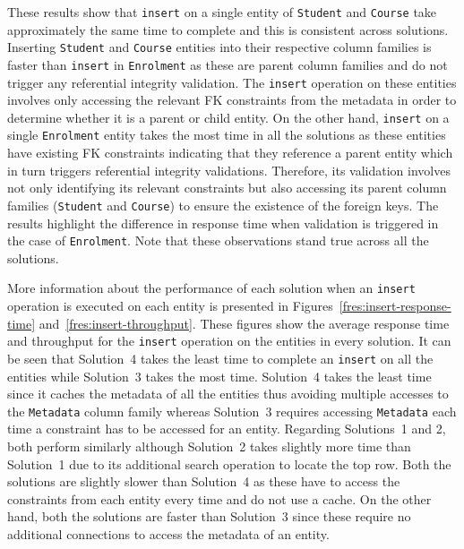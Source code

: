 These results show
that \texttt{insert} on a single entity of \texttt{Student} and \texttt{Course}
take approximately the same time to complete and this is consistent across
solutions.  Inserting \texttt{Student} and \texttt{Course} entities into their
respective column families is faster than \texttt{insert} in \texttt{Enrolment}
as these are parent column families and do not trigger any
referential integrity validation.
The \texttt{insert} operation on these entities involves only accessing the
relevant \ac{FK} constraints from the metadata in order to determine whether it
is a parent or child entity.  
On the other hand,  \texttt{insert} on a single \texttt{Enrolment} entity takes
the most time in all the solutions as these entities have existing \ac{FK}
constraints indicating that they reference a parent entity which in turn triggers
referential integrity validations.  Therefore,   its validation involves not only
identifying its relevant constraints but also accessing its parent column
families (\texttt{Student} and \texttt{Course}) to ensure the existence of the
foreign keys. 
The results highlight the difference in response time when validation is
triggered in the case of \texttt{Enrolment}. 
Note that these observations stand true across all the solutions. 

More information about the performance of each solution when an \texttt{insert}
operation is executed on each entity is presented in
Figures~\ref{fres:insert-response-time} and~\ref{fres:insert-throughput}.
These figures show the average response time and throughput for the
\texttt{insert} operation on  the  entities in every solution.
It can be seen that Solution~4 takes the least time to complete an
\texttt{insert} on all the entities while Solution~3 takes the most time.
 Solution~4 takes the least time since it caches the metadata of all the
 entities thus avoiding multiple accesses to the \texttt{Metadata} column family
 whereas Solution~3 requires accessing \texttt{Metadata} each time a constraint
 has to be accessed for an entity. Regarding Solutions~1 and 2,  both perform
 similarly although Solution~2 takes slightly  more time than Solution~1 due to
 its additional search operation to locate the top row. Both the solutions are
 slightly slower than Solution~4 as these have to access the constraints from
 each entity every time and do not use a cache. On the other hand, both the
 solutions are faster than Solution~3 since these require no additional
 connections to access the metadata of an entity.




